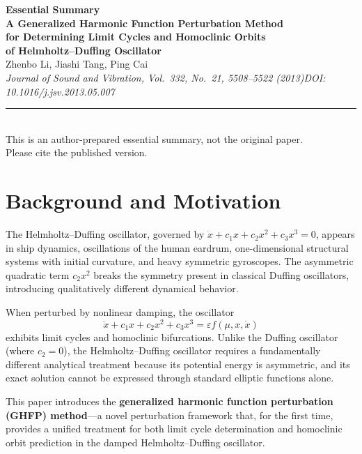 \documentclass[11pt,a4paper]{article}
\begin{document}
\begin{center}
{\LARGE\bfseries\color{primary}Essential Summary}\\[12pt]
{\large\bfseries A Generalized Harmonic Function Perturbation Method\\for Determining Limit Cycles and Homoclinic Orbits\\of Helmholtz--Duffing Oscillator}\\[8pt]
{\normalsize Zhenbo Li, Jiashi Tang, Ping Cai}\\[4pt]
{\small\itshape Journal of Sound and Vibration, Vol.\ 332, No.\ 21, 5508--5522 (2013)\quad DOI: 10.1016/j.jsv.2013.05.007}\\[6pt]
{\small\rule{0.7\textwidth}{0.5pt}}\\[4pt]
{\small\color{accent}This is an author-prepared essential summary, not the original paper.\\Please cite the published version.}
\end{center}

\vspace{0.5em}

\section{Background and Motivation}

The Helmholtz--Duffing oscillator, governed by $\ddot{x} + c_1 x + c_2 x^2 + c_3 x^3 = 0$, appears in ship dynamics, oscillations of the human eardrum, one-dimensional structural systems with initial curvature, and heavy symmetric gyroscopes. The asymmetric quadratic term $c_2 x^2$ breaks the symmetry present in classical Duffing oscillators, introducing qualitatively different dynamical behavior.

When perturbed by nonlinear damping, the oscillator
\begin{equation}
\ddot{x} + c_1 x + c_2 x^2 + c_3 x^3 = \varepsilon f(\mu, x, \dot{x})
\label{eq:model}
\end{equation}
exhibits limit cycles and homoclinic bifurcations. Unlike the Duffing oscillator (where $c_2=0$), the Helmholtz--Duffing oscillator requires a fundamentally different analytical treatment because its potential energy is asymmetric, and its exact solution cannot be expressed through standard elliptic functions alone.

This paper introduces the \textbf{generalized harmonic function perturbation (GHFP) method}---a novel perturbation framework that, for the first time, provides a unified treatment for both limit cycle determination and homoclinic orbit prediction in the damped Helmholtz--Duffing oscillator.
\end{document}
